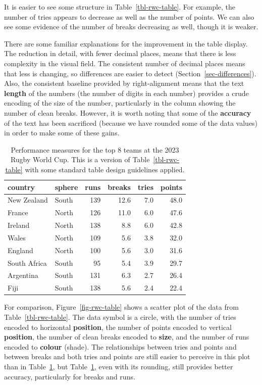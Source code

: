 \documentclass[
  letterpaper,
  DIV=11,
  numbers=noendperiod]{scrreprt}
\begin{document}
It is easier to see some structure in Table~\ref{tbl-rwc-table}. For
example, the number of tries appears to decrease as well as the number
of points. We can also see some evidence of the number of breaks
decreasing as well, though it is weaker.

There are some familiar explanations for the improvement in the table
display. The reduction in detail, with fewer decimal places, means that
there is less complexity in the visual field. The consistent number of
decimal places means that less is changing, so differences are easier to
detect (Section~\ref{sec-differences}). Also, the consistent baseline
provided by right-alignment means that the text \textbf{length} of the
numbers (the number of digits in each number) provides a crude encoding
of the size of the number, particularly in the column showing the number
of clean breaks. However, it is worth noting that some of the
\textbf{accuracy} of the text has been sacrificed (because we have
rounded some of the data values) in order to make some of these gains.

\begin{longtable}[]{@{}llrrrr@{}}

\caption{\label{tbl-rwc-table-tidy}Performance measures for the top 8
teams at the 2023 Rugby World Cup. This is a version of
Table~\ref{tbl-rwc-table} with some standard table design guidelines
applied.}

\tabularnewline

\toprule\noalign{}
country & sphere & runs & breaks & tries & points \\
\midrule\noalign{}
\endhead
\bottomrule\noalign{}
\endlastfoot
New Zealand & South & 139 & 12.6 & 7.0 & 48.0 \\
France & North & 126 & 11.0 & 6.0 & 47.6 \\
Ireland & North & 138 & 8.8 & 6.0 & 42.8 \\
Wales & North & 109 & 5.6 & 3.8 & 32.0 \\
England & North & 100 & 5.6 & 3.0 & 31.6 \\
South Africa & South & 95 & 5.4 & 3.9 & 29.7 \\
Argentina & South & 131 & 6.3 & 2.7 & 26.4 \\
Fiji & South & 138 & 5.6 & 2.4 & 22.4 \\

\end{longtable}

For comparison, Figure~\ref{fig-rwc-table} shows a scatter plot of the
data from Table~\ref{tbl-rwc-table}. The data symbol is a circle, with
the number of tries encoded to horizontal \textbf{position}, the number
of points encoded to vertical \textbf{position}, the number of clean
breaks encoded to \textbf{size}, and the number of runs encoded to
\textbf{colour} (shade). The relationships between tries and points and
between breaks and both tries and points are still easier to perceive in
this plot than in Table~\ref{tbl-rwc-table-tidy}, but
Table~\ref{tbl-rwc-table-tidy}, even with its rounding, still provides
better accuracy, particularly for breaks and runs.
\end{document}
